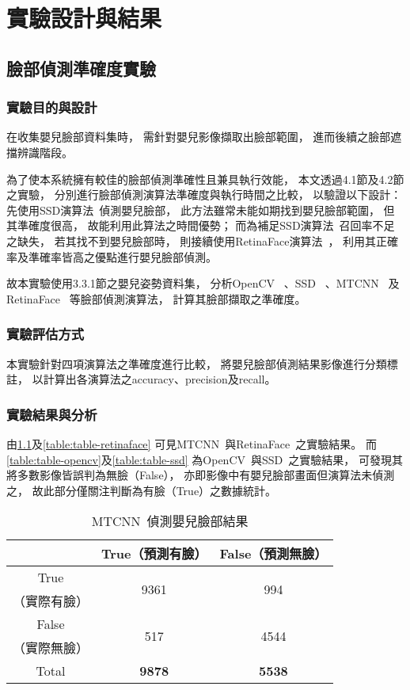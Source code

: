 \documentclass[class=NCU_thesis, crop=false]{standalone}
\begin{document}
\chapter{實驗設計與結果}

\section{臉部偵測準確度實驗}
\subsection{實驗目的與設計}
在收集嬰兒臉部資料集時，
需針對嬰兒影像擷取出臉部範圍，
進而後續之臉部遮擋辨識階段。

為了使本系統擁有較佳的臉部偵測準確性且兼具執行效能，
本文透過4.1節及4.2節之實驗，
分別進行臉部偵測演算法準確度與執行時間之比較，
以驗證以下設計：
先使用SSD演算法~\cite{ye_face_2021}偵測嬰兒臉部，
此方法雖常未能如期找到嬰兒臉部範圍，
但其準確度很高，
故能利用此算法之時間優勢；
而為補足SSD演算法~\cite{ye_face_2021}召回率不足之缺失，
若其找不到嬰兒臉部時，
則接續使用RetinaFace演算法~\cite{deng_retinaface_2020}，
利用其正確率及準確率皆高之優點進行嬰兒臉部偵測。

故本實驗使用3.3.1節之嬰兒姿勢資料集，
分析OpenCV~\cite{goyal_face_2017}
、SSD~\cite{ye_face_2021}
、MTCNN~\cite{zhang_joint_2016}
及RetinaFace~\cite{deng_retinaface_2020}
等臉部偵測演算法，
計算其臉部擷取之準確度。

\subsection{實驗評估方式}
本實驗針對四項演算法之準確度進行比較，
將嬰兒臉部偵測結果影像進行分類標註，
以計算出各演算法之accuracy、precision及recall。

\subsection{實驗結果與分析}
由\cref{table:table-mtcnn}及\cref{table:table-retinaface}
可見MTCNN~\cite{zhang_joint_2016}與RetinaFace~\cite{deng_retinaface_2020}之實驗結果。
而\cref{table:table-opencv}及\cref{table:table-ssd}
為OpenCV~\cite{goyal_face_2017}與SSD~\cite{ye_face_2021}之實驗結果，
可發現其將多數影像皆誤判為無臉（False），
亦即影像中有嬰兒臉部畫面但演算法未偵測之，
故此部分僅關注判斷為有臉（True）之數據統計。
\begin{table}[h]
    \centering
    \caption{MTCNN~\cite{zhang_joint_2016}偵測嬰兒臉部結果}
    \label{table:table-mtcnn}
    \begin{tabular}{ccc}
    \hline
     & True（預測有臉）& False（預測無臉）\\
    \hline
    True & \multirow{2}{*}{9361} & \multirow{2}{*}{994} \\
    （實際有臉）& & \\
    False & \multirow{2}{*}{517} & \multirow{2}{*}{4544} \\
    （實際無臉）&  & \\
    \hline
    Total & \textbf{9878} & \textbf{5538} \\
    \hline
    \end{tabular}
\end{table}
\end{document}
